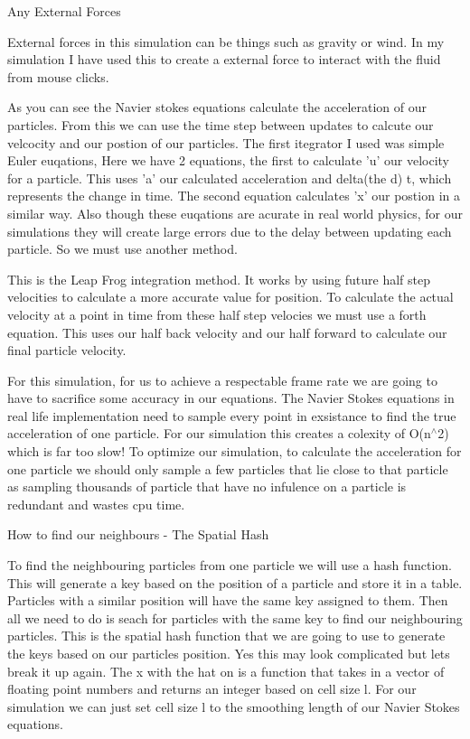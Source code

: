  Any External Forces\par
  External forces in this simulation can be things such as gravity or wind. In my simulation I have used this to create a external force to interact with the fluid from mouse clicks.\par
 \par
  As you can see the Navier stokes equations calculate the acceleration of our particles. From this we can use the time step between updates to calcute our velcocity and our postion of our particles. The first itegrator I used was simple Euler euqations,  Here we have 2 equations, the first to calculate 'u' our velocity for a particle. This uses 'a' our calculated acceleration and delta(the d) t, which represents the change in time. The second equation calculates 'x' our postion in a similar way. Also though these euqations are acurate in real world physics, for our simulations they will create large errors due to the delay between updating each particle. So we must use another method.\par
   This is the Leap Frog integration method. It works by using future half step velocities to calculate a more accurate value for position. To calculate the actual velocity at a point in time from these half step velocies we must use a forth equation.  This uses our half back velocity and our half forward to calculate our final particle velocity. \par
  For this simulation, for us to achieve a respectable frame rate we are going to have to sacrifice some accuracy in our equations. The Navier Stokes equations in real life implementation need to sample every point in exsistance to find the true acceleration of one particle. For our simulation this creates a colexity of O(n$^\wedge$2) which is far too slow! To optimize our simulation, to calculate the acceleration for one particle we should only sample a few particles that lie close to that particle as sampling thousands of particle that have no infulence on a particle is redundant and wastes cpu time.\par
 \par
 How to find our neighbours -\/ The Spatial Hash\par
 To find the neighbouring particles from one particle we will use a hash function. This will generate a key based on the position of a particle and store it in a table. Particles with a similar position will have the same key assigned to them. Then all we need to do is seach for particles with the same key to find our neighbouring particles.  This is the spatial hash function that we are going to use to generate the keys based on our particles position. Yes this may look complicated but lets break it up again. The x with the hat on is a function that takes in a vector of floating point numbers and returns an integer based on cell size l.  For our simulation we can just set cell size l to the smoothing length of our Navier Stokes equations.\par
